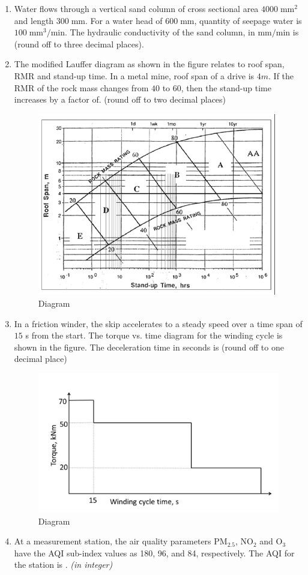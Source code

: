 \documentclass[journal,12pt,onecolumn]{IEEEtran}
\theoremstyle{remark}
\begin{document}
\begin{enumerate}
\item Water flows through a vertical sand column of cross sectional area $4000 \; \text{mm}^2$ and length $300 \; \text{mm}$. For a water head of $600 \; \text{mm}$, quantity of seepage water is $100 \; \text{mm}^3/\text{min}$. The hydraulic conductivity of the sand column, in $\text{mm}/\text{min}$ is (round off to three decimal places).

\hfill{}
\item The modified Lauffer diagram as shown in the figure relates to roof span, RMR and stand-up time. In a metal mine, roof span of a drive is $4 m$. If the RMR of the rock mass changes from $40$ to $60$, then the stand-up time increases by a factor of.     (round off to two decimal places) 
\begin{figure}[H]
\centering
\includegraphics[width=0.4\columnwidth]{figs/gRMR.png}
\caption{Diagram}
\label{fig:gRMR}
\end{figure}

\hfill{}
\item In a friction winder, the skip accelerates to a steady speed over a time span of $15$ s from the start. The torque vs. time diagram for the winding cycle is shown in the figure. The deceleration time in seconds is      (round off to one decimal place)
\begin{figure}[H]
\centering
\includegraphics[width=0.4\columnwidth]{figs/friction.png}
\caption{Diagram}
\label{fig:fric}
\end{figure}

\hfill{}
\item At a measurement station, the air quality parameters PM$_{2.5}$, NO$_2$ and O$_3$ 
have the AQI sub-index values as 180, 96, and 84, respectively. 
The AQI for the station is \underline{\hspace{1.5cm}}. 
\textit{(in integer)}


\end{enumerate}
\end{document}
